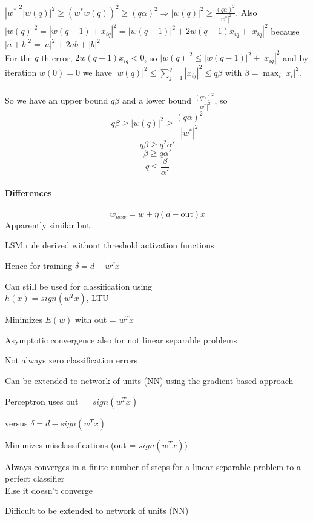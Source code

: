 \documentclass[10pt]{report}
\begin{document}
$|w^*|^2|w(q)|^2 \geq (w^*w(q))^2 \geq (q\alpha)^2 \Rightarrow |w(q)|^2 \geq \frac{(q\alpha)^2}{|w^*|^2}$. Also $|w(q)|^2 = |w(q-1)+ x_{iq}|^2 = |w(q-1)|^2 + 2w(q-1)x_{iq} + |x_{iq}|^2$ because $|a + b|^2 = |a|^2 + 2ab + |b|^2$\\
For the $q$-th error, $2w(q-1)x_{iq} < 0$, so $|w(q)|^2 \leq |w(q-1)|^2 + |x_{iq}|^2$ and by iteration $w(0) = 0$ we have $|w(q)|^2 \leq \sum_{j=1}^q |x_{ij}|^2 \leq q\beta$ with $\beta = \max_i |x_i|^2$.\\\\
So we have an upper bound $q\beta$ and a lower bound $\frac{(q\alpha)^2}{|w^*|^2}$, so $$q\beta\geq |w(q)|^2\geq \frac{(q\alpha)^2}{|w^*|^2}$$ $$q\beta\geq q^2\alpha'$$ $$\beta\geq q\alpha'$$ $$q \leq \frac{\beta}{\alpha'}$$
\pagebreak
\paragraph{Differences}
	$$w_{new} = w + \eta(d-\text{out})x$$
Apparently similar but:
\begin{multicols}{2}
	\begin{list}{}{\textbf{LMS algorithm}}
		\item LSM rule derived without threshold activation functions
		\item Hence for training $\delta = d - w^Tx$
		\item Can still be used for classification using\\$h(x) = sign(w^T x)$, LTU
		\item Minimizes $E(w)$ with out = $w^Tx$
		\item Asymptotic convergence also for not linear separable problems
		\item Not always zero classification errors
		\item Can be extended to network of units (NN) using the gradient based approach
	\end{list}
	\begin{list}{}{\textbf{Perceptron learning algorithm}}
		\item Perceptron uses out $= sign(w^Tx)$
		\item versus $\delta = d - sign(w^Tx)$
		\item
		\item Minimizes misclassifications (out = $sign(w^Tx)$)
		\item Always converges in a finite number of steps for a linear separable problem to a perfect classifier\\
		Else it doesn't converge
		\item 
		\item Difficult to be extended to network of units (NN)
	\end{list}
\end{multicols}
\end{document}

